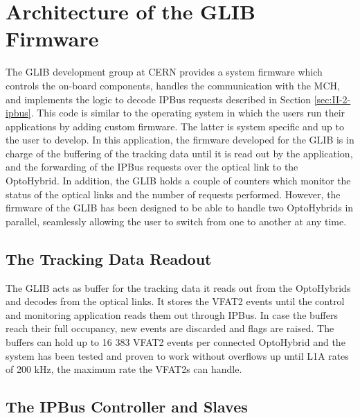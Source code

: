   \section{Architecture of the GLIB Firmware}

    The GLIB development group at CERN provides a system firmware which controls the on-board components, handles the communication with the MCH, and implements the logic to decode IPBus requests described in Section \ref{sec:II-2-ipbus}. This code is similar to the operating system in which the users run their applications by adding custom firmware. The latter is system specific and up to the user to develop. In this application, the firmware developed for the GLIB is in charge of the buffering of the tracking data until it is read out by the application, and the forwarding of the IPBus requests over the optical link to the OptoHybrid. In addition, the GLIB holds a couple of counters which monitor the status of the optical links and the number of requests performed. However, the firmware of the GLIB has been designed to be able to handle two OptoHybrids in parallel, seamlessly allowing the user to switch from one to another at any time.

    \subsection{The Tracking Data Readout}

      The GLIB acts as buffer for the tracking data it reads out from the OptoHybrids and decodes from the optical links. It stores the VFAT2 events until the control and monitoring application reads them out through IPBus. In case the buffers reach their full occupancy, new events are discarded and flags are raised. The buffers can hold up to 16 383 VFAT2 events per connected OptoHybrid and the system has been tested and proven to work without overflows up until L1A rates of 200 kHz, the maximum rate the VFAT2s can handle.

    \subsection{The IPBus Controller and Slaves}

